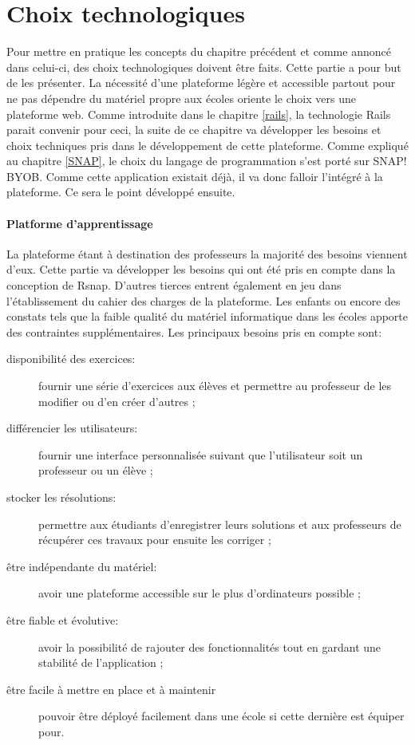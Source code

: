 \section{Choix technologiques}
Pour mettre en pratique les concepts du chapitre précédent et comme annoncé dans celui-ci, des choix technologiques doivent être faits. Cette partie a pour but de les présenter. La nécessité d'une plateforme légère et accessible partout pour ne pas dépendre du matériel propre aux écoles oriente le choix vers une plateforme web. 
Comme introduite dans le chapitre \ref{rails}, la technologie Rails parait convenir pour ceci, la suite de ce chapitre va développer les besoins et choix techniques pris dans le développement de cette plateforme. 
Comme expliqué au chapitre \ref{SNAP}, le choix du langage de programmation s'est porté sur SNAP! BYOB. Comme cette application existait déjà, il va donc falloir l'intégré à la plateforme. Ce sera le point développé ensuite.


\paragraph{Platforme d'apprentissage}
La plateforme étant à destination des professeurs la majorité des besoins viennent d'eux. Cette partie va développer les besoins qui ont été pris en compte dans la conception de Rsnap. D'autres tierces entrent également en jeu dans l'établissement du cahier des charges de la plateforme. Les enfants ou encore des constats tels que la faible qualité du matériel informatique dans les écoles apporte des contraintes supplémentaires. Les principaux besoins pris en compte sont:
\begin{description}
  \item[disponibilité des exercices:] fournir une série d'exercices aux élèves et permettre au professeur de les modifier ou d'en créer d'autres ;
  \item[différencier les utilisateurs:] fournir une interface personnalisée suivant que l'utilisateur soit un professeur ou un élève ;
  \item[stocker les résolutions:] permettre aux étudiants d'enregistrer leurs solutions et aux professeurs de récupérer ces travaux pour ensuite les corriger ;
  \item[être indépendante du matériel:] avoir une plateforme accessible sur le plus d'ordinateurs possible ;
  \item[être fiable et évolutive:] avoir la possibilité de rajouter des fonctionnalités tout en gardant une stabilité de l'application ;
  \item[être facile à mettre en place et à maintenir] pouvoir être déployé facilement dans une école si cette dernière est équiper pour.
\end{description}

